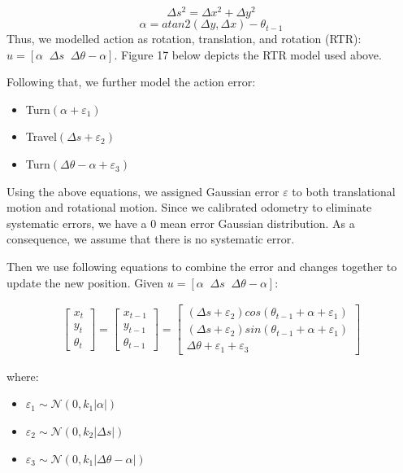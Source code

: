 \documentclass[journal]{IEEEtran}
\begin{document}
$$\Delta s^2 = \Delta x^2 + \Delta y^2$$
$$\alpha=atan2(\Delta y, \Delta x)-\theta_{t-1}$$
Thus, we modelled action as rotation, translation, and rotation (RTR): $u=[\alpha \; \; \Delta s \; \; \Delta \theta - \alpha]$. Figure 17 below depicts the RTR model used above. 

Following that, we further model the action error:
\begin{itemize}
  \item Turn$(\alpha + \varepsilon_1)$
  \item Travel$(\Delta s + \varepsilon_2)$
  \item Turn$(\Delta \theta -\alpha + \varepsilon_3)$
\end{itemize}

Using the above equations, we assigned Gaussian error $\varepsilon$ to both translational motion and rotational motion. Since we calibrated odometry to eliminate systematic errors, we have a 0 mean error Gaussian distribution. As a consequence, we assume that there is no systematic error.

Then we use following equations to combine the error and changes together to update the new position.
Given $u=[\alpha \; \; \Delta s \; \; \Delta \theta - \alpha]$:

\begin{gather*}
 \begin{bmatrix} x_t \\ y_t \\ \theta_t \end{bmatrix}
 =
 \begin{bmatrix} x_{t-1} \\ y_{t-1} \\ \theta_{t-1} \end{bmatrix}
 =
  \begin{bmatrix}
   (\Delta s + \varepsilon_2)cos(\theta_{t-1}+\alpha + \varepsilon_1)\\
   (\Delta s + \varepsilon_2)sin(\theta_{t-1}+\alpha + \varepsilon_1)\\
   \Delta \theta + \varepsilon_1 + \varepsilon_3 
   \end{bmatrix}
\end{gather*}

where:
\begin{itemize}
  \item $\varepsilon_1 \sim \mathcal{N} (0, k_1 |\alpha|)$
  \item $\varepsilon_2 \sim \mathcal{N} (0, k_2 |\Delta s|)$
  \item $\varepsilon_3 \sim \mathcal{N} (0, k_1 |\Delta \theta - \alpha|)$
\end{itemize}
\end{document}
